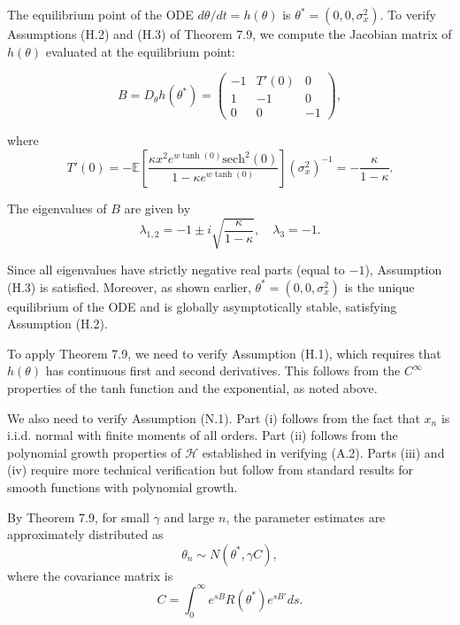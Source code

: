 \documentclass[11pt]{article}
\begin{document}
The equilibrium point of the ODE $d\theta/dt = h(\theta)$ is $\theta^* = (0, 0, \sigma^2_x)$.
To verify Assumptions (H.2) and (H.3) of Theorem 7.9, we compute the Jacobian matrix of $h(\theta)$ evaluated at the equilibrium point:

\begin{equation}
    B = D_\theta h(\theta^*) = \begin{pmatrix}
         - 1 & T'(0) & 0 \\
        1 & -1 & 0 \\
        0 & 0 & -1
    \end{pmatrix},
\end{equation}

where
\begin{equation}
    T'(0) = -\mathbb{E}\left[\frac{\kappa x^2 e ^ {w \tanh(0)} \textrm{sech}^2(0)}{1 - \kappa e ^ {w \tanh(0)} }  \right] \left(\sigma^2_x\right)^{-1} = -\frac{\kappa}{1 - \kappa}.
\end{equation}

The eigenvalues of $B$ are given by
\begin{equation}
    \lambda_{1,2} = -1 \pm i \sqrt{\frac{\kappa}{1 - \kappa}}, \quad \lambda_3 = - 1.
\end{equation}

Since all eigenvalues have strictly negative real parts (equal to $-1$), Assumption (H.3) is satisfied. Moreover, as shown earlier, $\theta^* = (0,0,\sigma^2_x)$ is the unique equilibrium of the ODE and is globally asymptotically stable, satisfying Assumption (H.2).

To apply Theorem 7.9, we need to verify Assumption (H.1), which requires that $h(\theta)$ has continuous first and second derivatives. This follows from the $C^\infty$ properties of the tanh function and the exponential, as noted above.

We also need to verify Assumption (N.1). Part (i) follows from the fact that $x_n$ is i.i.d. normal with finite moments of all orders. Part (ii) follows from the polynomial growth properties of $\mathcal{H}$ established in verifying (A.2). Parts (iii) and (iv) require more technical verification but follow from standard results for smooth functions with polynomial growth.

By Theorem 7.9, for small $\gamma$ and large $n$, the parameter estimates are approximately distributed as
\begin{equation}
    \theta_n \sim N\left(\theta^*, \gamma C\right),
\end{equation}
where the covariance matrix is
\begin{equation}
    C = \int_0^\infty e^{sB} R(\theta^*) e^{sB'} ds.
\end{equation}
\end{document}
